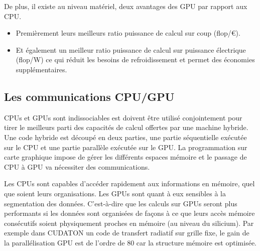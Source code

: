 De plus, il existe au niveau matériel, deux avantages des \ac{GPU} par rapport aux \ac{CPU}.
\begin{itemize}
\item Premièrement leurs meilleurs ratio puissance de calcul sur coup (flop/€).
\item Et également un meilleur ratio puissance de calcul sur puissance électrique (flop/W) ce qui réduit les besoins de refroidissement et permet des économies supplémentaires.
\end{itemize}







%
%
%
%


\subsection{Les communications CPU/GPU}
\label{sec:cpugpu}

\ac{CPU}s et \ac{GPU}s sont indissociables est doivent être utilisé conjointement pour tirer le meilleurs parti des capacités de calcul offertes par une machine hybride.
Une code hybride est découpé en deux parties, une partie séquentielle exécutée sur le \ac{CPU} et une partie parallèle exécutée sur le \ac{GPU}.
La programmation sur carte graphique impose de gérer les différents espaces mémoire et le passage de \ac{CPU} à \ac{GPU} va nécessiter des communications.

Les \ac{CPU}s sont capables d'accéder rapidement aux informations en mémoire, quel que soient leurs organisations.
Les \ac{GPU}s sont quant à eux sensibles à la segmentation des données.
C'est-à-dire que les calculs sur \ac{GPU}s seront plus performants si les données sont organisées de façons à ce que leurs accès mémoire consécutifs soient physiquement proches en mémoire (au niveau du silicium).
Par exemple dans CUDATON \citep{aubert_radiative_2008} un code de transfert radiatif sur grille fixe, le gain de la parallélisation \ac{GPU} est de l'ordre de $80$ car la structure mémoire est optimisée.

